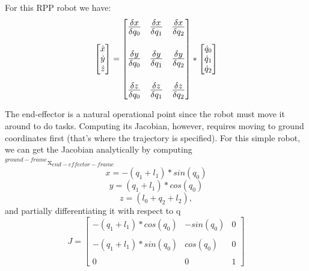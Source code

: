 \documentclass[12pt]{article}
\begin{document}
For this RPP robot we have:
\begin{equation}
  \begin{bmatrix} 
  \dot x \\
  \dot y \\
  \dot z \\
  \end{bmatrix} 
  = 
  {\Large
  \begin{bmatrix} 
    \frac{\delta x}{\delta q_0} & \frac{\delta x}{\delta q_1} & \frac{\delta x}{\delta q_2} \\
    \\
    \frac{\delta y}{\delta q_0} & \frac{\delta y}{\delta q_1} & \frac{\delta y}{\delta q_2} \\ 
    \\
    \frac{\delta z}{\delta q_0} & \frac{\delta z}{\delta q_1} & \frac{\delta z}{\delta q_2}
  \end{bmatrix} 
  }* 
  \begin{bmatrix}
  \dot q_0 \\
  \dot q_1 \\
  \dot q_2 
  \end{bmatrix} 
\end{equation}

The end-effector is a natural operational point since the robot must move it around to do 
tasks. Computing its Jacobian, however, requires moving to ground coordinates first (that's
where the trajectory is specified). For this simple robot, we can get the Jacobian analytically by 
computing\\ $^{ground-frame}$x$_{end-effector-frame}$
\begin{equation}
  x = -(q_1 + l_1) * sin(q_0)
\end{equation}
\begin{equation}
  y = (q_1 + l_1) * cos(q_0)
\end{equation}
\begin{equation}
  z = (l_0+q_2 + l_2),
\end{equation}
 and partially differentiating it with respect to q
\begin{equation}
  J = 
  \begin{bmatrix} 
    -(q_1 + l_1) * cos(q_0) & -sin(q_0) & 0 \\
    \\
    -(q_1 + l_1) * sin(q_0) & cos(q_0) & 0 \\ 
    \\
    0 & 0 & 1
  \end{bmatrix}
\end{equation}
\end{document}
